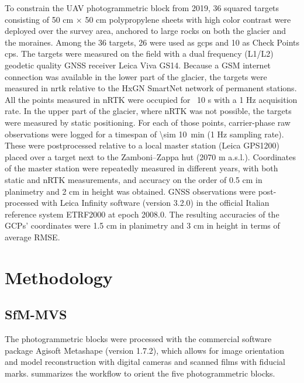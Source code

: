 To constrain the UAV photogrammetric block from 2019, 36 squared targets consisting of 50 cm × 50 cm polypropylene sheets with high color contrast were deployed over the survey area, anchored to large rocks on both the glacier and the moraines. 
Among the 36 targets, 26 were used as \acp{gcp} and 10 as Check Points \acp{cp}.
The targets were measured on the field with a dual frequency (L1/L2) geodetic quality GNSS receiver Leica Viva GS14. Because a GSM internet connection was available in the lower part of the glacier, the targets were measured in \ac{nrtk} relative to the HxGN SmartNet
network of permanent stations. All the points measured in nRTK were occupied for ~10 s with a 1 Hz acquisition rate. In the upper part of the glacier, where nRTK was not possible, the targets were measured by static positioning. For each of those points, carrier-phase raw observations were logged for a timespan of \SI{\sim 10}{\minute} (1 Hz sampling rate).
These were postprocessed relative to a local master station (Leica GPS1200) placed over a target next to the Zamboni–Zappa hut (2070 m a.s.l.). 
Coordinates of the master station were repeatedly measured in different years, with both static and nRTK measurements, and accuracy on the order of 0.5 cm in planimetry and 2 cm in height was obtained. 
GNSS observations were post-processed with Leica Infinity software (version 3.2.0) in the official Italian reference system ETRF2000 at epoch 2008.0. 
The resulting accuracies of the GCPs' coordinates were 1.5 cm in planimetry and 3 cm in height in terms of average RMSE.

\section{Methodology}\label{sec:2:methods}

\subsection{SfM-MVS}

The photogrammetric blocks were processed with the commercial software package Agisoft Metashape (version 1.7.2), which allows for image orientation and model reconstruction with digital cameras and scanned films with fiducial marks.
 summarizes the workflow to orient the five photogrammetric blocks.


